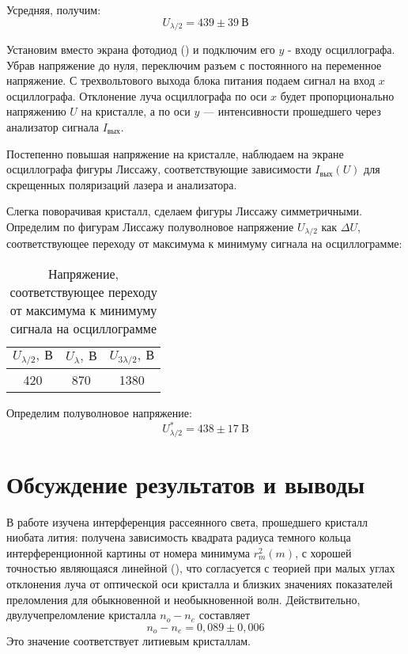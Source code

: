 \documentclass[a4paper, 12pt]{article}
\begin{document}
Усредняя, получим:
\[
    U_{\lambda/2} = 439 \pm 39\ \text{В}
\]

Установим вместо экрана фотодиод () и подключим его $y$ -
входу осциллографа. Убрав напряжение до нуля, переключим разъем с
постоянного на переменное напряжение. С трехвольтового выхода блока
питания подаем сигнал на вход $x$ осциллографа. Отклонение луча
осциллографа по оси $x$ будет пропорционально напряжению $U$ на
кристалле, а по оси $y$ --- интенсивности прошедшего через анализатор
сигнала $I_\text{вых}$.

Постепенно повышая напряжение на кристалле, наблюдаем на экране
осциллографа фигуры Лиссажу, соответствующие зависимости
$I_\text{вых}(U)$ для скрещенных поляризаций лазера и анализатора.

Слегка поворачивая кристалл, сделаем фигуры Лиссажу симметричными.
Определим по фигурам Лиссажу полуволновое напряжение $U_{\lambda/2}$
как $\Delta U$, соответствующее переходу от максимума к минимуму
сигнала на осциллограмме:


\begin{table}[H]
\centering
\begin{tabular}{|c|c|c|}
    \hline 
    $U_{\lambda/2},\ \text{В}$ & $U_{\lambda},\ \text{В}$ &
    $U_{3\lambda/2},\ \text{В}$ \\ \hline 
    420 & 870 & 1380 \\ \hline 
\end{tabular}
\caption{Напряжение, соответствующее переходу от максимума к минимуму
сигнала на осциллограмме}
\end{table}

Определим полуволновое напряжение:
\[
    U_{\lambda/2}^{*} = 438 \pm 17\ \text{B}
\]



\section{Обсуждение результатов и выводы}
В работе изучена интерференция рассеянного света, прошедшего кристалл
ниобата лития: получена зависимость квадрата радиуса темного кольца
интерференционной картины от номера минимума $r_m^2(m)$, с хорошей
точностью являющаяся линейной (), что
согласуется с теорией при малых углах отклонения луча от оптической
оси кристалла и близких значениях показателей преломления для
обыкновенной и необыкновенной волн. Действительно, двулучепреломление
кристалла $n_o - n_e$ составляет
\[
    n_o - n_e = 0,089\pm 0,006
\]
Это значение соответствует литиевым кристаллам. 
	
\end{document}
